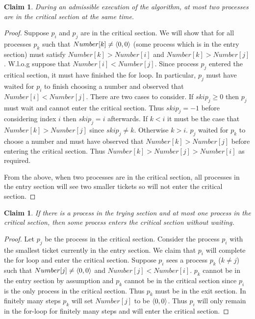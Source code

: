 \documentclass[11pt]{article}
\newtheorem{claim}[theorem]{Claim}
\DeclarePairedDelimiter\anglebrac{\langle}{\rangle}
\begin{document}
\begin{claim}
During an admissible execution of the algorithm, at most two processes are in the critical section at the same time.
\end{claim}
\begin{proof}
Suppose $p_i$ and $p_j$ are in the critical section. We will show that for all processes $p_k$ such that $Number[k] \neq \anglebrac{0,0}$ (some process which is in the entry section) must satisfy $Number[k] > Number[i]$ and $Number[k] > Number[j]$. W.l.o.g suppose that $Number[i] < Number[j]$. Since process $p_j$ entered the critical section, it must have finished the for loop. In particular, $p_j$ must have waited for $p_i$ to finish choosing a number and observed that $Number[i] < Number[j]$. There are two cases to consider. If $skip_j \geq 0$ then $p_j$ must wait and cannot enter the critical section. Thus $skip_j = -1$ before considering index $i$ then $skip_j = i$ afterwards. If $k < i$ it must be the case that $Number[k] > Number[j]$ since $skip_j \neq k$. Otherwise $k > i$. $p_j$ waited for $p_k$ to choose a number and must have observed that $Number[k] > Number[j]$ before entering the critical section. Thus $Number[k] > Number[j] > Number[i]$ as required. 

From the above, when two processes are in the critical section, all processes in the entry section will see two smaller tickets so will not enter the critical section.   
\end{proof}


\begin{claim}
If there is a process in the trying section and at most one process in the critical section, then some process enters the critical section without waiting.
\end{claim}
\begin{proof}
Let $p_j$ be the process in the critical section. Consider the process $p_i$ with the smallest ticket currently in the entry section. We claim that $p_i$ will complete the for loop and enter the critical section. Suppose $p_i$ sees a process $p_k$ ($k \neq j$) such that $Number[j] \neq \anglebrac{0,0}$ and $Number[j] < Number[i]$. $p_k$ cannot be in the entry section by assumption and $p_k$ cannot be in the critical section since $p_i$ is the only process in the critical section. Thus $p_k$ must be in the exit section. In finitely many steps $p_k$ will set $Number[j]$ to be $\anglebrac{0,0}$. Thus $p_i$ will only remain in the for-loop for finitely many steps and will enter the critical section.
\end{proof} 

\end{document}
